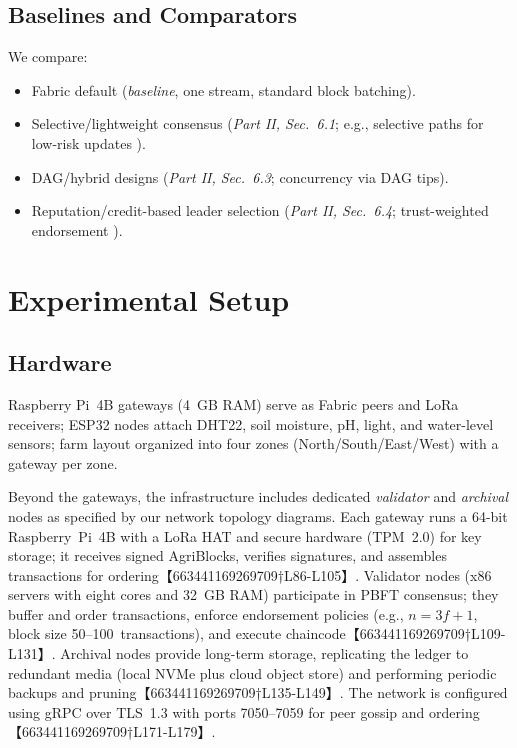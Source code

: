 \subsection{Baselines and Comparators}
We compare:
\begin{itemize}
  \item Fabric default (\textit{baseline}, one stream, standard block batching).
  \item Selective/lightweight consensus (\emph{Part II, Sec.~6.1}; e.g., selective paths for low-risk updates \cite{ali2022blockchainenabledarchitecture}).
  \item DAG/hybrid designs (\emph{Part II, Sec.~6.3}; concurrency via DAG tips).
  \item Reputation/credit-based leader selection (\emph{Part II, Sec.~6.4}; trust-weighted endorsement \cite{morais2023surveyonintegration}).
\end{itemize}

\section{Experimental Setup}

\subsection{Hardware}
Raspberry Pi~4B gateways (4~GB RAM) serve as Fabric peers and LoRa receivers; ESP32 nodes attach DHT22, soil moisture, pH, light, and water-level sensors; farm layout organized into four zones (North/South/East/West) with a gateway per zone. %

Beyond the gateways, the infrastructure includes dedicated \emph{validator} and \emph{archival} nodes as specified by our network topology diagrams.  Each gateway runs a 64-bit Raspberry~Pi~4B with a LoRa HAT and secure hardware (TPM~2.0) for key storage; it receives signed AgriBlocks, verifies signatures, and assembles transactions for ordering【663441169269709†L86-L105】.  Validator nodes (x86 servers with eight cores and 32~GB RAM) participate in PBFT consensus; they buffer and order transactions, enforce endorsement policies (e.g., $n=3f+1$, block size 50–100~transactions), and execute chaincode【663441169269709†L109-L131】.  Archival nodes provide long-term storage, replicating the ledger to redundant media (local NVMe plus cloud object store) and performing periodic backups and pruning【663441169269709†L135-L149】.  The network is configured using gRPC over TLS~1.3 with ports 7050–7059 for peer gossip and ordering【663441169269709†L171-L179】.

